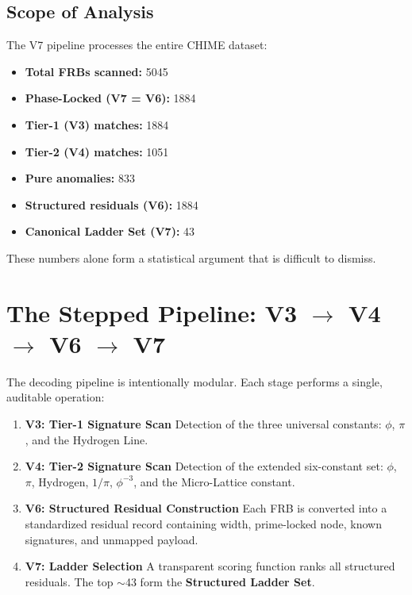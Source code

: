 \documentclass[11pt, letterpaper, openany]{book}
\begin{document}
\subsection*{Scope of Analysis}

The V7 pipeline processes the entire CHIME dataset:

\begin{itemize}
    \item \textbf{Total FRBs scanned:} 5045
    \item \textbf{Phase-Locked (V7 = V6):} 1884
    \item \textbf{Tier-1 (V3) matches:} 1884
    \item \textbf{Tier-2 (V4) matches:} 1051
    \item \textbf{Pure anomalies:} 833
    \item \textbf{Structured residuals (V6):} 1884
    \item \textbf{Canonical Ladder Set (V7):} 43
\end{itemize}

These numbers alone form a statistical argument that is difficult to dismiss.

\section{The Stepped Pipeline: V3 $\rightarrow$ V4 $\rightarrow$ V6 $\rightarrow$ V7}

The decoding pipeline is intentionally modular. Each stage performs a single, auditable operation:

\begin{enumerate}
    \item \textbf{V3: Tier-1 Signature Scan}  
    Detection of the three universal constants: $\phi$, $\pi$, and the Hydrogen Line.

    \item \textbf{V4: Tier-2 Signature Scan}  
    Detection of the extended six-constant set: $\phi$, $\pi$, Hydrogen, $1/\pi$, $\phi^{-3}$,
    and the Micro-Lattice constant.

    \item \textbf{V6: Structured Residual Construction}  
    Each FRB is converted into a standardized residual record containing width, prime-locked
    node, known signatures, and unmapped payload.

    \item \textbf{V7: Ladder Selection}  
    A transparent scoring function ranks all structured residuals. The top $\sim$43 form the
    \textbf{Structured Ladder Set}.
\end{enumerate}
\end{document}

